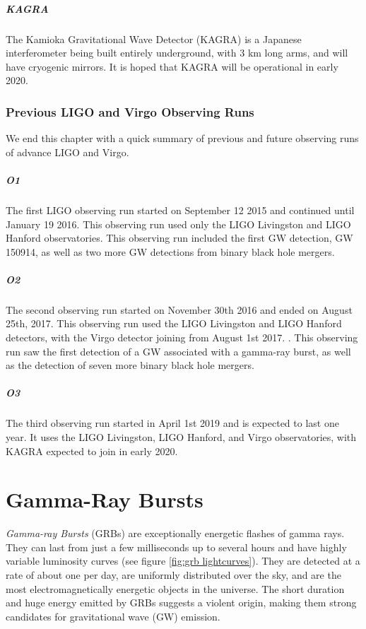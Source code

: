 \documentclass[11pt]{cuthesis}
\begin{document}
\paragraph{KAGRA}
The Kamioka Gravitational Wave Detector (KAGRA) is a Japanese interferometer being built entirely underground, with 3 km long arms, and will have cryogenic mirrors. It is hoped that KAGRA will be operational in early 2020.

\subsection{Previous LIGO and Virgo Observing Runs}
We end this chapter with a quick summary of previous and future observing runs of advance LIGO and Virgo.

\paragraph{O1} The first LIGO observing run started on September 12 2015 and continued until January 19 2016. \cite{o1grb} This observing run used only the LIGO Livingston and LIGO Hanford observatories. This observing run included the first GW detection, GW 150914, as well as two more GW detections from binary black hole mergers. \cite{catalog}

\paragraph{O2} The second observing run started on November 30th 2016 and ended on August 25th, 2017. This observing run used the LIGO Livingston and LIGO Hanford detectors, with the Virgo detector joining from August 1st 2017. \cite{o2grb}. This observing run saw the first detection of a GW associated with a gamma-ray burst, as well as the detection of seven more binary black hole mergers. \cite{catalog}

\paragraph{O3} The third observing run started in April 1st 2019 and is expected to last one year. It uses the LIGO Livingston, LIGO Hanford, and Virgo observatories, with KAGRA expected to join in early 2020. 



\chapter{Gamma-Ray Bursts} \label{chap:GRBs}
\textit{Gamma-ray Bursts} (GRBs) are exceptionally energetic flashes of gamma rays. They can last from just a few milliseconds up to several hours and have highly variable luminosity curves (see figure \ref{fig:grb lightcurves}). They are detected at a rate of about one per day, are uniformly distributed over the sky, and are the most electromagnetically energetic objects in the universe. The short duration and huge energy emitted by GRBs suggests a violent origin, making them strong candidates for gravitational wave (GW) emission.
\end{document}
